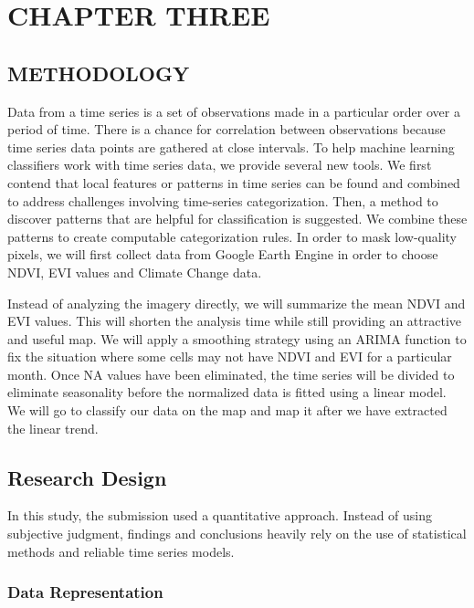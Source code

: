 \documentclass[12pt,a4paper]{book}
\begin{document}
{\hypertarget{chapter-three}{%
\chapter{CHAPTER THREE}\label{chapter-three}}

\hypertarget{methodology}{%
\section{METHODOLOGY}\label{methodology}}

Data from a time series is a set of observations made in a particular
order over a period of time. There is a chance for correlation between
observations because time series data points are gathered at close
intervals. To help machine learning classifiers work with time series
data, we provide several new tools. We first contend that local features
or patterns in time series can be found and combined to address
challenges involving time-series categorization. Then, a method to
discover patterns that are helpful for classification is suggested. We
combine these patterns to create computable categorization rules. In
order to mask low-quality pixels, we will first collect data from Google
Earth Engine in order to choose NDVI, EVI values and Climate Change
data.

Instead of analyzing the imagery directly, we will summarize the mean
NDVI and EVI values. This will shorten the analysis time while still
providing an attractive and useful map. We will apply a smoothing
strategy using an ARIMA function to fix the situation where some cells
may not have NDVI and EVI for a particular month. Once NA values have
been eliminated, the time series will be divided to eliminate
seasonality before the normalized data is fitted using a linear model.
We will go to classify our data on the map and map it after we have
extracted the linear trend.

\hypertarget{research-design}{%
\section{Research Design}\label{research-design}}

In this study, the submission used a quantitative approach. Instead of
using subjective judgment, findings and conclusions heavily rely on the
use of statistical methods and reliable time series models.

\hypertarget{data-representation}{%
\subsection{Data Representation}\label{data-representation}}

}
\end{document}
